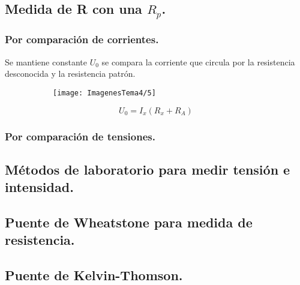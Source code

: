 \subsection{Medida de R con una $R_p$.}
\subsubsection{Por comparación de corrientes.}
Se mantiene constante $U_0$ se compara la corriente que circula por la resistencia desconocida y la resistencia patrón.
\begin{figure}[H]
	\begin{minipage}{0.5\textwidth}
		\begin{figure}[H]
			\centering
			\texttt{[image: ImagenesTema4/5]}
			\label{fig:5}
		\end{figure}
	\end{minipage}
	\begin{minipage}{0.5\textwidth}
	\[U_0=I_x(R_x+R_A)\]
	\end{minipage}
\end{figure}



\subsubsection{Por comparación de tensiones.}
\subsection{Métodos de laboratorio para medir tensión e intensidad.}
\subsection{Puente de Wheatstone para medida de resistencia.}
\subsection{Puente de Kelvin-Thomson.}